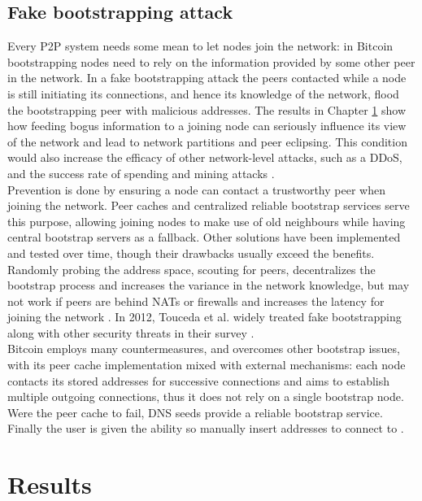 \documentclass[12pt, letterpaper, twoside]{article}
\begin{document}
\subsection{Fake bootstrapping attack}\label{fakeboot}
Every P2P system needs some mean to let nodes join the network: in Bitcoin bootstrapping nodes need to rely on the information provided by some other peer in the network. In a fake bootstrapping attack the peers contacted while a node is still initiating its connections, and hence its knowledge of the network, flood the bootstrapping peer with malicious addresses. The results in Chapter \ref{res} show how feeding bogus information to a joining node can seriously influence its view of the network and lead to network partitions and peer eclipsing. This condition would also increase the efficacy of other network-level attacks, such as a DDoS, and the success rate of spending and mining attacks \cite{eclipseatk}.\\
Prevention is done by ensuring a node can contact a trustworthy peer when joining the network. Peer caches and centralized reliable bootstrap services serve this purpose, allowing joining nodes to make use of old neighbours while having central bootstrap servers as a fallback. Other solutions have been implemented and tested over time, though their drawbacks usually exceed the benefits. Randomly probing the address space, scouting for peers, decentralizes the bootstrap process and increases the variance in the network knowledge, but may not work if peers are behind NATs or firewalls and increases the latency for joining the network \cite{decentrbootstrapp2p} \cite{localityaware}. In 2012,  Touceda et al. widely treated fake bootstrapping along with other security threats in their survey \cite{toucedafakeboot}.\\
Bitcoin employs many countermeasures, and overcomes other bootstrap issues, with its peer cache implementation mixed with external mechanisms: each node contacts its stored addresses for successive connections and aims to establish multiple outgoing connections, thus it does not rely on a single bootstrap node. Were the peer cache to fail, DNS seeds provide a reliable bootstrap service. Finally the user is given the ability so manually insert addresses to connect to \cite{mahmoud_netsec_boot}.

\section{Results}\label{res}




















\end{document}
